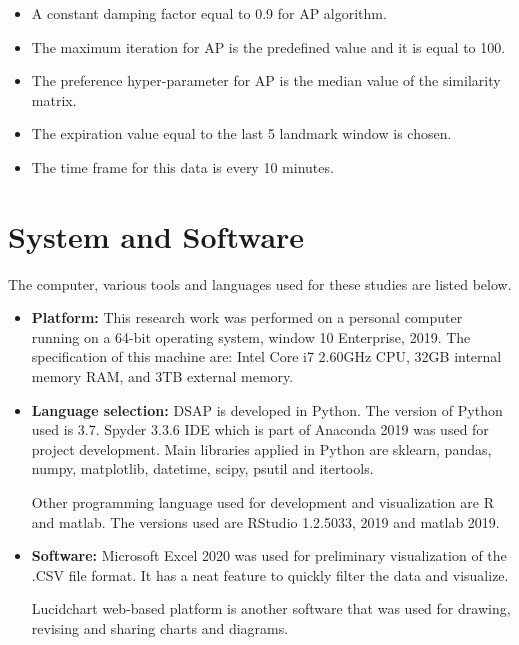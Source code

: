 \documentclass[../UNBThesis2.tex]{subfiles}
\begin{document}
\begin{itemize}
    \item A constant damping factor equal to 0.9 for AP algorithm.
    \item The maximum iteration for AP is the predefined value and it is equal to 100.
    \item The preference hyper-parameter for AP is the median value of the similarity matrix.
    \item The expiration value equal to the last 5 landmark window is chosen. 
    \item The time frame for this data is every 10 minutes.
    
\end{itemize}






\section{System and Software}
The computer, various tools and languages used for these studies are listed below.

\begin{itemize}
    \item\textbf{Platform:} This research work was performed on a personal computer running on a 64-bit operating system, window 10 Enterprise, 2019. The specification of this machine are: Intel Core i7 2.60GHz CPU, 32GB internal memory RAM, and 3TB external memory. 
    \item\textbf{Language selection:} DSAP is developed in Python. The version of Python used is 3.7. Spyder 3.3.6 IDE which is part of Anaconda 2019 was used for project development. Main libraries applied in Python are sklearn, pandas, numpy, matplotlib, datetime, scipy, psutil and itertools.
    
    Other programming language used for development and visualization are R and matlab. The versions used are RStudio 1.2.5033, 2019 and matlab 2019. 
    
    \item\textbf{Software:} Microsoft Excel 2020 was used for preliminary visualization of the .CSV file format. It has a neat feature to quickly filter the data and visualize.
    
    Lucidchart web-based platform is another software that was used for drawing, revising and sharing charts and diagrams.
    

\end{itemize}

\end{document}
